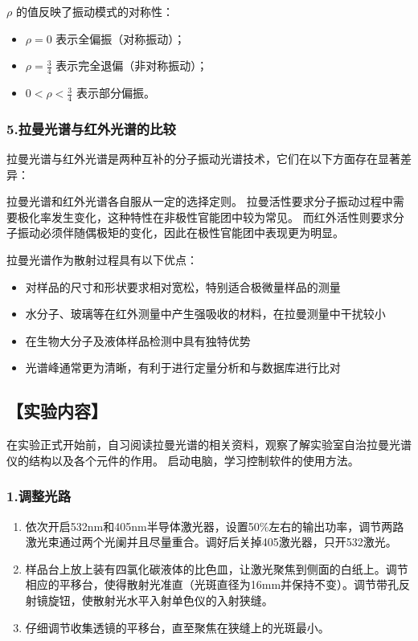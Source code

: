 \documentclass[12pt,a4paper,UTF8]{ctexart}
\begin{document}
	$\rho$ 的值反映了振动模式的对称性：
	\begin{itemize}
		\item $\rho = 0$ 表示全偏振（对称振动）；
		\item $\rho = \frac{3}{4}$ 表示完全退偏（非对称振动）；
		\item $0 < \rho < \frac{3}{4}$ 表示部分偏振。
	\end{itemize}

\subsubsection*{5.拉曼光谱与红外光谱的比较}
	拉曼光谱与红外光谱是两种互补的分子振动光谱技术，它们在以下方面存在显著差异：
	
	拉曼光谱和红外光谱各自服从一定的选择定则。
	拉曼活性要求分子振动过程中需要极化率发生变化，这种特性在非极性官能团中较为常见。
	而红外活性则要求分子振动必须伴随偶极矩的变化，因此在极性官能团中表现更为明显。
	
	拉曼光谱作为散射过程具有以下优点：
	\begin{itemize}
		\item 对样品的尺寸和形状要求相对宽松，特别适合极微量样品的测量
		\item 水分子、玻璃等在红外测量中产生强吸收的材料，在拉曼测量中干扰较小
		\item 在生物大分子及液体样品检测中具有独特优势
		\item 光谱峰通常更为清晰，有利于进行定量分析和与数据库进行比对
	\end{itemize}

	

\subsection*{【实验内容】}
	在实验正式开始前，自习阅读拉曼光谱的相关资料，观察了解实验室自治拉曼光谱仪的结构以及各个元件的作用。
	启动电脑，学习控制软件的使用方法。\cite{LRS_manual}

\subsubsection*{1.调整光路}
	
	\begin{enumerate}
		\item 依次开启532nm和405nm半导体激光器，设置50\%左右的输出功率，调节两路激光束通过两个光阑并且尽量重合。调好后关掉405激光器，只开532激光。
		\item 样品台上放上装有四氯化碳液体的比色皿，让激光聚焦到侧面的白纸上。调节相应的平移台，使得散射光准直（光斑直径为16mm并保持不变）。调节带孔反射镜旋钮，使散射光水平入射单色仪的入射狭缝。
		\item 仔细调节收集透镜的平移台，直至聚焦在狭缝上的光斑最小。
	\end{enumerate}
	
\end{document}
